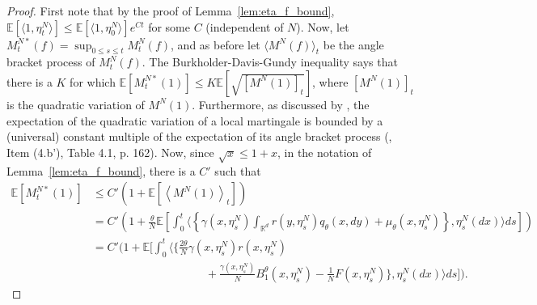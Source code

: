 \documentclass[EJP]{ejpecp} %
\newcommand{\IE}{\mathbb E}
\newcommand{\IR}{\mathbb R}
\newcommand{\citet}[1]{\cite{#1}}
\begin{document}
\begin{proof}
    First note that by the proof of Lemma~\ref{lem:eta_f_bound},
    $\IE[\langle 1, \eta^N_t \rangle] \le \IE[\langle 1, \eta^N_0 \rangle] e^{Ct}$
    for some $C$ (independent of $N$).
    Now, let $M^{N*}_t(f) = \sup_{0 \le s \le t} M^N_t(f)$,
    and as before let $\langle M^N(f) \rangle_t$ be the angle bracket process of $M^N_t(f)$.
    The Burkholder-Davis-Gundy inequality says that there is a $K$ for which
    $\IE\left[ M^{N*}_t(1) \right] \le K \IE[\sqrt{[M^N(1)]_t}]$,
    where $[M^N(1)]_t$ is the quadratic variation of $M^N(1)$.
    Furthermore, as discussed by \citet{hernandez/jacka:2022},
    the expectation of the quadratic variation of a local martingale
    is bounded by a (universal) constant multiple of the expectation of its angle bracket process
    (\cite{barlow/jacka/yor:1986}, Item (4.b'), Table 4.1, p. 162).
    Now, since $\sqrt{x} \le 1 + x$,
    in the notation of Lemma~\ref{lem:eta_f_bound}, there is a $C'$ such that
    \begin{align*}
        \IE\left[ M^{N*}_t(1) \right]
        &\le
        C'\left( 1 + \IE\left[ \left\langle M^N(1) \right\rangle_t \right] \right)
        \\ &=
        C'\left( 1 + \frac{\theta}{N} \IE\left[
            \int_0^t
	    \Big\langle\left\{
                \gamma(x, \eta^N_s)
                \int_{\IR^d} r(y, \eta^N_s) q_\theta(x, dy)
                + \mu_\theta(x, \eta^N_s)
            \right\}, \eta_s^N(dx)\Big\rangle
            ds
            \right] \right)
        \\ &=
        C'\Big( 1 + \IE\Big[
            \int_0^t
	    \Big\langle\Big\{
                \frac{2\theta}{N} \gamma(x, \eta^N_s) r(x, \eta^N_s)
        \\ &\qquad\qquad\qquad\qquad \qquad {}
		+ \frac{\gamma(x,\eta_s^N)}{N} 
		B^\theta_1(x, \eta^N_s)-\frac{1}{N}F(x,\eta^N_s)
            \Big\}, \eta_s^N(dx) \Big\rangle
            ds
            \Big] \Big) .
    \end{align*}


\end{proof}
\end{document}
